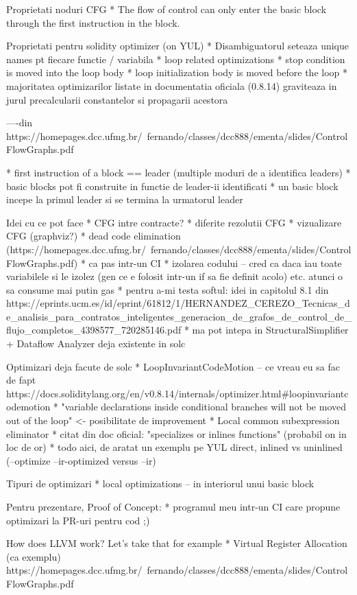 Proprietati noduri CFG
* The	flow	of	control	can	only	
enter	the	basic	block	through	
the	first	instruction	in	the	
block.

Proprietati pentru solidity optimizer (on YUL)
* Disambiguatorul seteaza unique names pt fiecare functie / variabila
* loop related optimizations
  * stop condition is moved into the loop body
  * loop initialization body is moved before the loop
  * majoritatea optimizarilor listate in documentatia oficiala (0.8.14) graviteaza in jurul precalcularii constantelor si propagarii acestora

----din https://homepages.dcc.ufmg.br/~fernando/classes/dcc888/ementa/slides/ControlFlowGraphs.pdf

* first instruction of a block == leader (multiple moduri de a identifica leaders)
* basic blocks pot fi construite in functie de leader-ii identificati
  * un basic block incepe la primul leader si se termina la urmatorul leader

Idei cu ce pot face
* CFG intre contracte?
* diferite rezolutii CFG
* vizualizare CFG (graphviz?)
* dead code elimination (https://homepages.dcc.ufmg.br/~fernando/classes/dcc888/ementa/slides/ControlFlowGraphs.pdf)
  * ca pas intr-un CI
* izolarea codului – cred ca daca iau toate variabilele si le izolez (gen ce e folosit intr-un if sa fie definit acolo) etc. atunci o sa consume mai putin gas
* pentru a-mi testa softul: idei in capitolul 8.1 din https://eprints.ucm.es/id/eprint/61812/1/HERNANDEZ_CEREZO_Tecnicas_de_analisis_para_contratos_inteligentes_generacion_de_grafos_de_control_de_flujo_completos_4398577_720285146.pdf
* ma pot intepa in StructuralSimplifier + Dataflow Analyzer deja existente in solc

Optimizari deja facute de solc
* LoopInvariantCodeMotion – ce vreau eu sa fac de fapt https://docs.soliditylang.org/en/v0.8.14/internals/optimizer.html#loopinvariantcodemotion
  * "variable declarations inside conditional branches will not be moved out of the loop" <- posibilitate de improvement
* Local common subexpression eliminator
* citat din doc oficial: "specializes or inlines functions" (probabil on in loc de or)
  * todo aici, de aratat un exemplu pe YUL direct, inlined vs uninlined (--optimize --ir-optimized versus --ir)


Tipuri de optimizari
* local optimizations – in interiorul unui basic block

Pentru prezentare, Proof of Concept:
* programul meu intr-un CI care propune optimizari la PR-uri pentru cod ;)


How does LLVM work? Let's take that for example
* Virtual Register Allocation (ca exemplu)
https://homepages.dcc.ufmg.br/~fernando/classes/dcc888/ementa/slides/ControlFlowGraphs.pdf